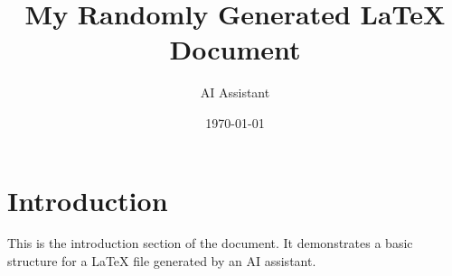 \documentclass{article}
\title{My Randomly Generated LaTeX Document}
\author{AI Assistant}
\date{\today}
\begin{document}
\maketitle

\section{Introduction}
This is the introduction section of the document. It demonstrates a basic structure for a LaTeX file generated by an AI assistant.
\end{document}

